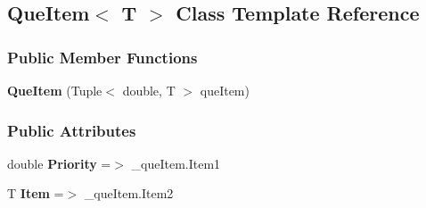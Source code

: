 \hypertarget{classDataTools_1_1utils_1_1QueItem}{}\subsection{Que\+Item$<$ T $>$ Class Template Reference}
\label{classDataTools_1_1utils_1_1QueItem}
\subsubsection*{Public Member Functions}
\begin{DoxyCompactItemize}
\item 
\mbox{\label{classDataTools_1_1utils_1_1QueItem_aec640d3f850f25436538b7b8d239dfa0}} 
{\bfseries Que\+Item} (Tuple$<$ double, T $>$ que\+Item)
\end{DoxyCompactItemize}
\subsubsection*{Public Attributes}
\begin{DoxyCompactItemize}
\item 
\mbox{\label{classDataTools_1_1utils_1_1QueItem_a1df2408757f0d8d500537d26c948fb0c}} 
double {\bfseries Priority} =$>$ \+\_\+que\+Item.\+Item1
\item 
\mbox{\label{classDataTools_1_1utils_1_1QueItem_ae76754367b2a77c2bcde5342ad346a26}} 
T {\bfseries Item} =$>$ \+\_\+que\+Item.\+Item2
\end{DoxyCompactItemize}

